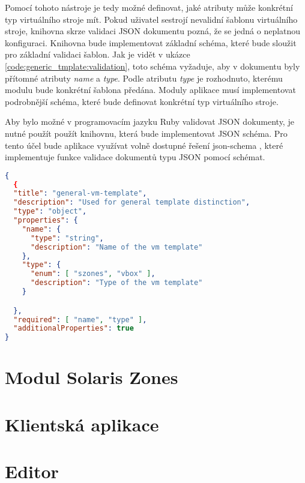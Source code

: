 Pomocí tohoto nástroje je tedy možné definovat, jaké atributy může konkrétní typ virtuálního stroje mít. Pokud uživatel sestrojí
nevalidní šablonu virtuálního stroje, knihovna skrze validaci JSON dokumentu pozná, že se jedná o neplatnou konfiguraci. Knihovna
bude implementovat základní schéma, které bude sloužit pro základní validaci šablon. Jak je vidět v ukázce \ref{code:generic_tmplate:validation},
toto schéma vyžaduje, aby v dokumentu byly přítomné atributy \textit{name} a \textit{type}. Podle atributu \textit{type} je 
rozhodnuto, kterému modulu bude konkrétní šablona předána. Moduly aplikace musí implementovat podrobnější schéma, které bude
definovat konkrétní typ virtuálního stroje.

Aby bylo možné v programovacím jazyku Ruby validovat JSON dokumenty, je nutné použít použít knihovnu, která bude implementovat
JSON schéma. Pro tento účel bude aplikace využívat volně dostupné řešení json-schema \cite{json:schema:ruby}, které implementuje
funkce validace dokumentů typu JSON pomocí schémat.
\begin{lstlisting}[language=json, caption={Schéma generické šablony}, float, label={code:generic_tmplate:validation}]  
{
  {
  "title": "general-vm-template",
  "description": "Used for general template distinction",
  "type": "object",
  "properties": {
    "name": {
      "type": "string",
      "description": "Name of the vm template"
    },
    "type": {
      "enum": [ "szones", "vbox" ],
      "description": "Type of the vm template"
    }

  },
  "required": [ "name", "type" ],
  "additionalProperties": true
}
\end{lstlisting}
\section{Modul Solaris Zones}
\label{chapter:implementation:szones}


\section{Klientská aplikace}
\section{Editor}
